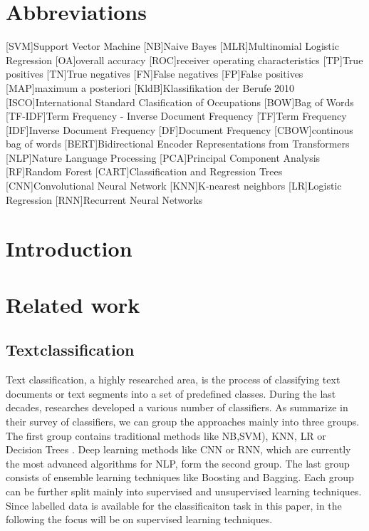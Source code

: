 \documentclass[12pt, a4paper, titlepage]{article}
\begin{document}
\section*{Abbreviations}
\begin{acronym}
  [SVM]{Support Vector Machine}
  [NB]{Naive Bayes}
  [MLR]{Multinomial Logistic Regression}
  [OA]{overall accuracy}
  [ROC]{receiver operating characteristics}
  [TP]{True positives}
  [TN]{True negatives}
  [FN]{False negatives}
  [FP]{False positives}
  [MAP]{maximum a posteriori}
  [KldB]{Klassifikation der Berufe 2010}
  [ISCO]{International Standard Clasification of Occupations}
  [BOW]{Bag of Words}
  [TF-IDF]{Term Frequency - Inverse Document Frequency}
  [TF]{Term Frequency}
  [IDF]{Inverse Document Frequency}
  [DF]{Document Frequency}
  [CBOW]{continous bag of words}
  [BERT]{Bidirectional Encoder  Representations from Transformers}
  [NLP]{Nature Language Processing}
  [PCA]{Principal Component Analysis}
  [RF]{Random Forest}
  [CART]{Classification and Regression Trees}
  [CNN]{Convolutional Neural Network}
  [KNN]{K-nearest neighbors}
  [LR]{Logistic Regression}
  [RNN]{Recurrent Neural Networks}
\end{acronym}
\newpage

\section{Introduction}
\section{Related work}
\subsection{Textclassification}
Text classification, a highly researched area, is the process of classifying text documents or text segments into a set of predefined classes. During the last decades, researches developed a various number of classifiers. As \cite{kowsari2019text} summarize in their survey of classifiers, we can group the approaches mainly into three groups. The first group contains traditional methods like \ac{NB},\ac{SVM}), \ac{KNN}, \ac{LR} or Decision Trees \citep{Vijayan2017, Colas2006, kowsari2019text, Sebastiani2001}. Deep learning methods like \ac{CNN} or \ac{RNN}, which are currently the most advanced algorithms for NLP, form the second group. The last group consists of ensemble learning techniques like Boosting and Bagging. Each group can be further split mainly into supervised and unsupervised learning techniques. Since labelled data is available for the classificaiton task in this paper, in the following the focus will be on supervised learning techniques. 
\end{document}

